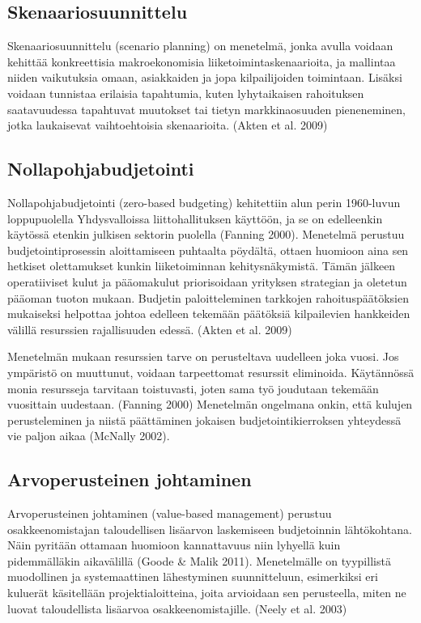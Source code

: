 \documentclass[12pt,a4paper,oneside,pdftex]{report}
\begin{document}
\subsection{Skenaariosuunnittelu}

Skenaariosuunnittelu (scenario planning) on menetelmä, jonka avulla voidaan kehittää konkreettisia makroekonomisia liiketoimintaskenaarioita, ja mallintaa niiden vaikutuksia omaan, asiakkaiden ja jopa kilpailijoiden toimintaan. Lisäksi voidaan tunnistaa erilaisia tapahtumia, kuten lyhytaikaisen rahoituksen saatavuudessa tapahtuvat muutokset tai tietyn markkinaosuuden pieneneminen, jotka laukaisevat vaihtoehtoisia skenaarioita. (Akten et al. 2009)

\subsection{Nollapohjabudjetointi}

Nollapohjabudjetointi (zero-based budgeting) kehitettiin alun perin 1960-luvun loppupuolella Yhdysvalloissa liittohallituksen käyttöön, ja se on edelleenkin käytössä etenkin julkisen sektorin puolella (Fanning 2000). Menetelmä perustuu budjetointiprosessin aloittamiseen puhtaalta pöydältä, ottaen huomioon aina sen hetkiset olettamukset kunkin liiketoiminnan kehitysnäkymistä. Tämän jälkeen operatiiviset kulut ja pääomakulut priorisoidaan yrityksen strategian ja oletetun pääoman tuoton mukaan. Budjetin paloitteleminen tarkkojen rahoituspäätöksien mukaiseksi helpottaa johtoa edelleen tekemään päätöksiä kilpailevien hankkeiden välillä resurssien rajallisuuden edessä. (Akten et al. 2009)

Menetelmän mukaan resurssien tarve on perusteltava uudelleen joka vuosi. Jos ympäristö on muuttunut, voidaan tarpeettomat resurssit eliminoida. Käytännössä monia resursseja tarvitaan toistuvasti, joten sama työ joudutaan tekemään vuosittain uudestaan. (Fanning 2000) Menetelmän ongelmana onkin, että kulujen perusteleminen ja niistä päättäminen jokaisen budjetointikierroksen yhteydessä vie paljon aikaa (McNally 2002).

\subsection{Arvoperusteinen johtaminen}

Arvoperusteinen johtaminen (value-based management) perustuu osakkeenomistajan taloudellisen lisäarvon laskemiseen budjetoinnin lähtökohtana. Näin pyritään ottamaan huomioon kannattavuus niin lyhyellä kuin pidemmälläkin aikavälillä (Goode & Malik 2011). Menetelmälle on tyypillistä muodollinen ja systemaattinen lähestyminen suunnitteluun, esimerkiksi eri kuluerät käsitellään projektialoitteina, joita arvioidaan sen perusteella, miten ne luovat taloudellista lisäarvoa osakkeenomistajille. (Neely et al. 2003)
\end{document}
